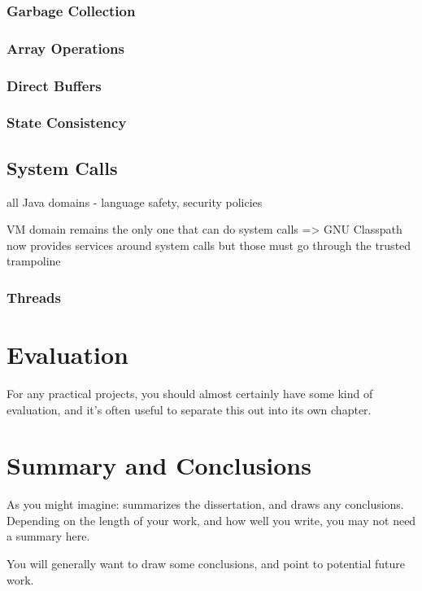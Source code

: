 \documentclass[a4paper,12pt,twoside,openright]{report}
\begin{document}
\subsection{Garbage Collection}

\subsection{Array Operations}

\subsection{Direct Buffers}
\label{sec:DirectBuffers}

\subsection{State Consistency}

\section{System Calls}

all Java domains - language safety, security policies

VM domain remains the only one that can do system calls => GNU Classpath now provides services around system calls but those must go through the trusted trampoline

\subsection{Threads}

\chapter{Evaluation} 

For any practical projects, you should almost certainly have
some kind of evaluation, and it's often useful to separate 
this out into its own chapter. 


\chapter{Summary and Conclusions} 

As you might imagine: summarizes the dissertation, and draws 
any conclusions. Depending on the length of your work, and 
how well you write, you may not need a summary here. 

You will generally want to draw some conclusions, and point
to potential future work. 




\appendix
\singlespacing

 
 
\end{document}

